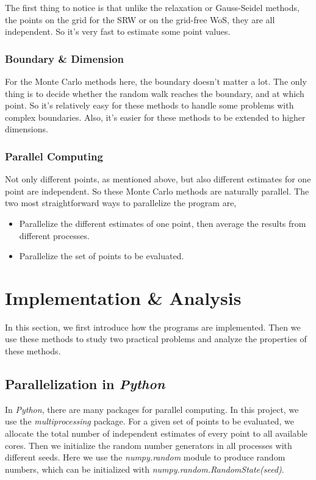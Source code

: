 \documentclass[aps, prl, reprint, groupedaddress]{revtex4-1}
\begin{document}
The first thing to notice is that unlike the relaxation or Gauss-Seidel methods, the points on the grid for the SRW or on the grid-free WoS, they are all independent. So it's very fast to estimate some point values.

\subsubsection{Boundary \& Dimension}

For the Monte Carlo methods here, the boundary doesn't matter a lot. The only thing is to decide whether the random walk reaches the boundary, and at which point. So it's relatively easy for these methods to handle some problems with complex boundaries. Also, it's easier for these methods to be extended to higher dimensions.

\subsubsection{Parallel Computing}

Not only different points, as mentioned above, but also different estimates for one point are independent. So these Monte Carlo methods are naturally parallel. The two most straightforward ways to parallelize the program are,
\begin{itemize}
    \item Parallelize the different estimates of one point, then average the results from different processes.
    \item Parallelize the set of points to be evaluated.
\end{itemize}


\section{Implementation \& Analysis}

In this section, we first introduce how the programs are implemented. Then we use these methods to study two practical problems and analyze the properties of these methods.

\subsection{Parallelization in \emph{Python}}

In \emph{Python}, there are many packages for parallel computing. In this project, we use the \emph{multiprocessing} package. For a given set of points to be evaluated, we allocate the total number of independent estimates of every point to all available cores. Then we initialize the random number generators in all processes with different seeds. Here we use the \emph{numpy.random} module to produce random numbers, which can be initialized with \emph{numpy.random.RandomState(seed)}.
\end{document}
